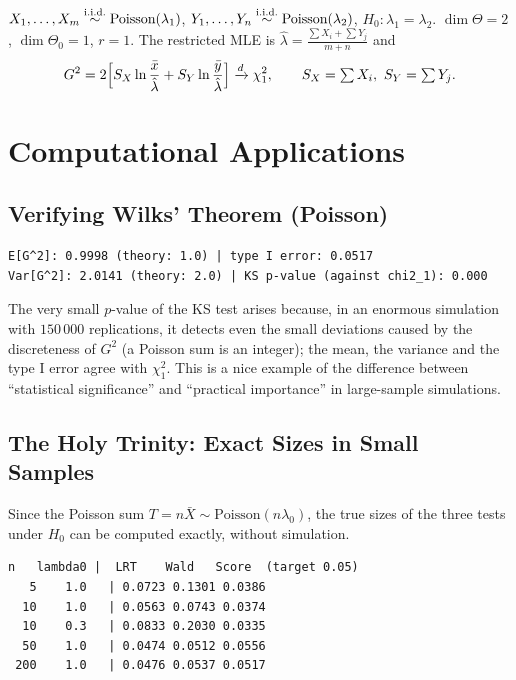 \documentclass[main.tex]{subfiles}
\begin{document}
\begin{example}
$X_1,\dots,X_m\overset{\text{i.i.d.}}{\sim}\text{Poisson}(\lambda_1)$, $Y_1,\dots,Y_n\overset{\text{i.i.d.}}{\sim}\text{Poisson}(\lambda_2)$, $H_0:\lambda_1=\lambda_2$. $\dim\Theta=2$, $\dim\Theta_0=1$, $r=1$. The restricted MLE is $\hat\lambda=\frac{\sum X_i+\sum Y_j}{m+n}$ and
\[
G^2=2\Big[S_X\ln\frac{\bar x}{\hat\lambda}+S_Y\ln\frac{\bar y}{\hat\lambda}\Big]\xrightarrow{d}\chi^2_1,\qquad S_X=\textstyle\sum X_i,\ S_Y=\sum Y_j.
\]
\end{example}

\section{Computational Applications}

\subsection{Verifying Wilks' Theorem (Poisson)}

\begin{lstlisting}[style=output]
E[G^2]: 0.9998 (theory: 1.0) | type I error: 0.0517
Var[G^2]: 2.0141 (theory: 2.0) | KS p-value (against chi2_1): 0.000
\end{lstlisting}

The very small $p$-value of the KS test arises because, in an enormous simulation with $150\,000$ replications, it detects even the small deviations caused by the discreteness of $G^2$ (a Poisson sum is an integer); the mean, the variance and the type I error agree with $\chi^2_1$. This is a nice example of the difference between ``statistical significance'' and ``practical importance'' in large-sample simulations.

\subsection{The Holy Trinity: Exact Sizes in Small Samples}
Since the Poisson sum $T=n\bar X\sim\text{Poisson}(n\lambda_0)$, the true sizes of the three tests under $H_0$ can be computed exactly, without simulation.

\begin{lstlisting}[style=output]
 n   lambda0 |  LRT    Wald   Score  (target 0.05)
   5    1.0   | 0.0723 0.1301 0.0386
  10    1.0   | 0.0563 0.0743 0.0374
  10    0.3   | 0.0833 0.2030 0.0335
  50    1.0   | 0.0474 0.0512 0.0556
 200    1.0   | 0.0476 0.0537 0.0517
\end{lstlisting}
\end{document}
